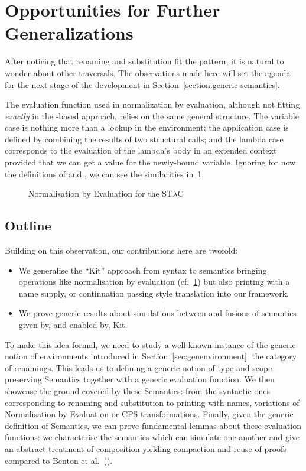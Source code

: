 \section{Opportunities for Further Generalizations}

After noticing that renaming and substitution fit the pattern, it is
natural to wonder about other traversals. The observations made here
will set the agenda for the next stage of the development in
Section~\ref{section:generic-semantics}.

The evaluation function used in normalization by evaluation, although
not fitting \emph{exactly} in the -based approach, relies on
the same general structure. The variable case is nothing more than a
lookup in the environment; the application case is defined by combining
the results of two structural calls; and the lambda case corresponds to
the evaluation of the lambda's body in an extended context provided that
we can get a value for the newly-bound variable. Ignoring for now the
definitions of  and , we can see the similarities
in~\cref{nbe}.

\begin{figure}[h]
\caption{Normalisation by Evaluation for the ST$λ$C\label{nbe}}
\end{figure}

\subsection{Outline} Building on this observation, our contributions here are twofold:

\begin{itemize}
  \item
    We generalise the ``Kit'' approach from syntax to semantics bringing
    operations like normalisation by evaluation (cf.~\cref{nbe}) but also
    printing with a name supply, or continuation passing style translation
    into our framework.

  \item
    We prove generic results about simulations between and fusions of
    semantics given by, and enabled by, Kit.
\end{itemize}

To make this idea formal, we need to study a well known instance
of the generic notion of environments introduced in
Section~\ref{sec:genenvironment}: the category of renamings.
This leads us to defining a generic notion of type
and scope-preserving Semantics together with a generic evaluation function.
We then showcase the ground covered by these Semantics: from the syntactic ones
corresponding to renaming and substitution to printing with names,
variations of Normalisation by Evaluation or CPS transformations.
Finally, given the generic
definition of Semantics, we can prove fundamental lemmas about these
evaluation functions: we characterise the semantics which can simulate
one another and give an abstract treatment of composition yielding
compaction and reuse of proofs compared to Benton et
al.~(\citeyear{benton2012strongly}).


